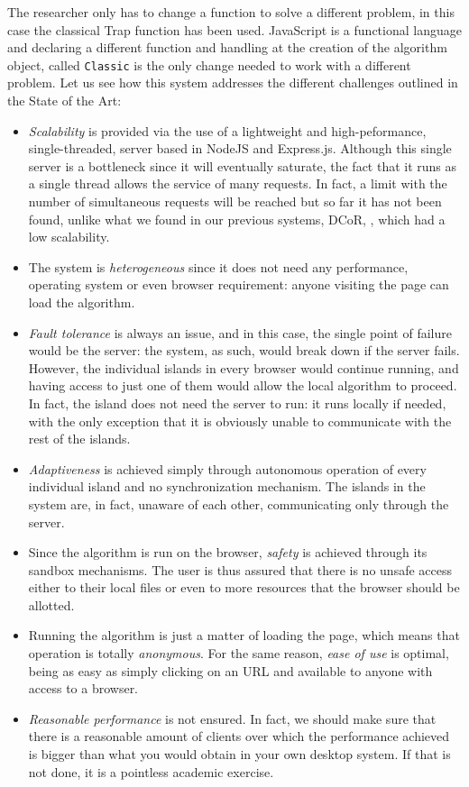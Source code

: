 \documentclass[journal,onecolumn]{IEEEtran}
\begin{document}
The researcher only has to change a function to solve a different
problem, in this case the classical Trap function has been
used. JavaScript is a functional language and declaring a different
function and handling at the creation of the algorithm object, called
{\tt Classic} is the only change needed to work with a different
problem. Let us see how this system addresses the different challenges
outlined in the State of the Art:\begin{itemize}
\item {\em Scalability} is provided via the use of a lightweight and
  high-peformance, single-threaded, server based in NodeJS and
  Express.js. Although this single server is a bottleneck since it
  will eventually saturate, the fact that it runs as a single thread
  allows the service of many requests. In fact, a limit with the
  number of simultaneous requests will be reached but so far it has
  not been found, unlike what we found in our previous systems, DCoR,
  \cite{gecco07:workshop:dcor}, which had a low scalability.
\item The system is {\em heterogeneous} since it does not need any
  performance, operating system or even browser requirement: anyone
  visiting the page can load the algorithm.
\item {\em Fault tolerance} is always an issue, and in this case, the
  single point of failure would be the server: the system, as such,
  would break down if the server fails. However, the individual
  islands in every browser would continue running, and having access
  to just one of them would allow the local algorithm to proceed. In
  fact, the island does not need the server to run: it runs locally if
  needed, with the only exception that it is obviously unable to
  communicate with the rest of the islands.
\item {\em Adaptiveness} is achieved simply through autonomous
  operation of every individual island and no synchronization
  mechanism. The islands in the system are, in fact, unaware of each
  other, communicating only through the server.
\item Since the algorithm is run on the browser, {\em safety} is
  achieved through its sandbox mechanisms. The user is thus assured
  that there is no unsafe access either to their local files or even
  to more resources that the browser should be allotted.
\item Running the algorithm is just a matter of loading the page,
  which means that operation is totally {\em anonymous}. For the same
  reason, {\em ease of use} is optimal, being as easy as simply
  clicking on an URL and available to anyone with access to a browser.
\item {\em Reasonable performance} is not ensured. In fact, we should
  make sure that there is a reasonable amount of clients over which
  the performance achieved is bigger than what you would obtain in
  your own desktop system. If that is not done, it is a pointless
  academic exercise.
\end{itemize}
\end{document}
